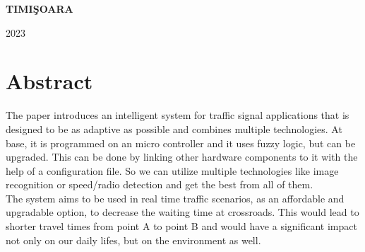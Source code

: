 \documentclass[17pt]{article}
\begin{document}
\vfill
\begin{center}
{\bf TIMI\c SOARA

2023}
\end{center}

\newpage
\normalsize{}

\section*{Abstract}
\indent \indent
The paper introduces an intelligent system for traffic
signal applications that is designed to be as adaptive
as possible and combines multiple technologies.
At base, it is programmed on an micro controller and it
uses fuzzy logic, but can be upgraded. This can be done by
linking other hardware components to it with the help of a
configuration file. So we can utilize multiple technologies
like image recognition or speed/radio detection and get the
best from all of them.\\
\indent The system aims to be used in real time
traffic scenarios, as an affordable and upgradable option,
to decrease the waiting time at crossroads.
This would lead to shorter travel times from point
A to point B and would have a significant impact not only
on our daily lifes, but on the environment as well.

\pagebreak

\tableofcontents

\pagebreak

\listoftables

\pagebreak

\listoffigures
\pagebreak
\end{document}

